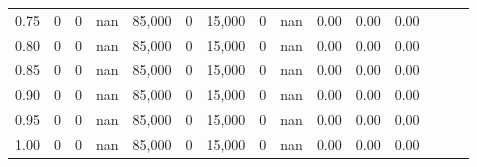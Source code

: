 \begin{tabular}{rrrrrrrrrrrrrrr}
0.75 &       0 &      0 &   nan &  85,000 &       0 &  15,000 &       0 &   nan &  0.00 &  0.00 &      0.00 \\
0.80 &       0 &      0 &   nan &  85,000 &       0 &  15,000 &       0 &   nan &  0.00 &  0.00 &      0.00 \\
0.85 &       0 &      0 &   nan &  85,000 &       0 &  15,000 &       0 &   nan &  0.00 &  0.00 &      0.00 \\
0.90 &       0 &      0 &   nan &  85,000 &       0 &  15,000 &       0 &   nan &  0.00 &  0.00 &      0.00 \\
0.95 &       0 &      0 &   nan &  85,000 &       0 &  15,000 &       0 &   nan &  0.00 &  0.00 &      0.00 \\
1.00 &       0 &      0 &   nan &  85,000 &       0 &  15,000 &       0 &   nan &  0.00 &  0.00 &      0.00 \\
\bottomrule
\end{tabular}
